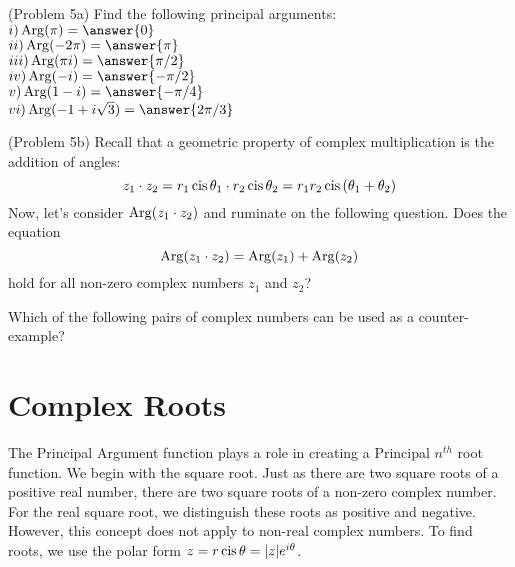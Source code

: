 \documentclass[handout]{ximera}
\begin{document}
\begin{problem}(Problem 5a)
Find the following principal arguments:\\
$i) \Arg(\pi) = \answer{0}$\\
$ii) \Arg(-2\pi) = \answer{\pi}$\\
$iii) \Arg(\pi i) = \answer{\pi/2}$\\
$iv) \Arg(-i) = \answer{-\pi/2}$\\
$v) \Arg(1-i) = \answer{-\pi/4}$\\
$vi) \Arg(-1+i\sqrt 3) = \answer{2\pi/3}$
\end{problem}

\begin{problem}(Problem 5b)
Recall that a geometric property of complex multiplication is the addition of angles:
\[
z_1 \cdot z_2 = r_1 \operatorname{cis}\theta_1 \cdot r_2 \operatorname{cis}\theta_2 = r_1r_2\operatorname{cis}\left(\theta_1+\theta_2\right)
\]
Now, let's consider $\operatorname{Arg}(z_1 \cdot z_2)$ and ruminate on the following question.
Does the equation 
\[
\operatorname{Arg}(z_1\cdot z_2) = \operatorname{Arg}(z_1) + \operatorname{Arg}(z_2)
\]
hold for all non-zero complex numbers $z_1$ and $z_2$?
\begin{multipleChoice}
\end{multipleChoice}
Which of the following pairs of complex numbers can be used as a counter-example?
\begin{selectAll}
\end{selectAll}

\end{problem}



\section{Complex Roots}

The Principal Argument function plays a role in creating a Principal $n^{th}$ root function.
We begin with the square root. Just as there are two square roots of a positive real number, there are two square roots of a non-zero complex number.
For the real square root, we distinguish these roots as positive and negative. However, this concept does not apply to non-real 
complex numbers. To find roots, we use the polar form $z = r\operatorname{cis}\theta = |z|e^{i\theta}$.
\end{document}

